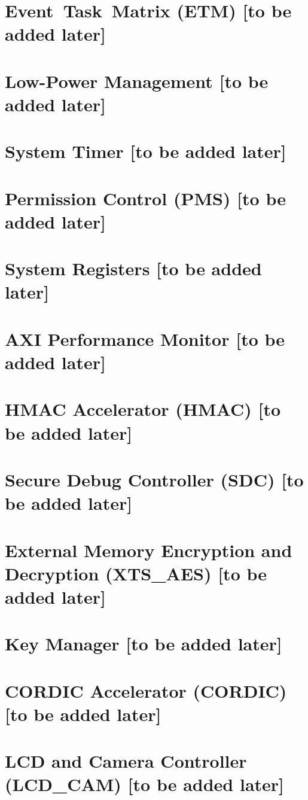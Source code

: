 \documentclass{article}
\begin{document}
\section{Event Task Matrix (ETM) [to be added later]}\label{mod:evntaskmatrix}
\section{Low-Power Management [to be added later]}\label{mod:lowpowm}
\section{System Timer [to be added later]}\label{mod:systimer}
\section{Permission Control (PMS) [to be added later]}\label{mod:permctrl}
\section{System Registers [to be added later]}\label{mod:sysreg}
\section{AXI Performance Monitor [to be added later]}\label{mod:aximon}
\section{HMAC Accelerator (HMAC) [to be added later]}\label{mod:hmac}
\section{Secure Debug Controller (SDC) [to be added later]}\label{mod:sdc}
\section{External Memory Encryption and Decryption (XTS\_AES) [to be added later]}\label{mod:extmemencr}
\section{Key Manager  [to be added later]}\label{mod:keymng}
\section{CORDIC Accelerator (CORDIC) [to be added later]}\label{mod:cordic}
\section{LCD and Camera Controller (LCD\_CAM) [to be added later]}\label{mod:camlcdctrl}
\end{document}
